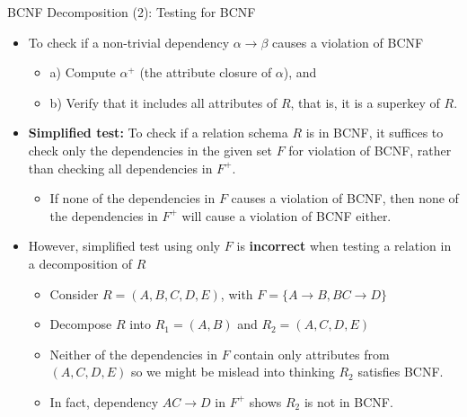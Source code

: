 \documentclass[aspectratio=169, xcolor=dvipsnames]{beamer}
\begin{document}
\begin{frame}{BCNF Decomposition (2): Testing for BCNF}
    \begin{itemize}[<+->]
        \item To check if a non-trivial dependency $\alpha \rightarrow \beta$ causes a violation of BCNF
        \begin{itemize}
            \item[$\triangleright$] a) Compute $\alpha^+$ (the attribute closure of $\alpha$), and
            \item[$\triangleright$] b) Verify that it includes all attributes of $R$, that is, it is a superkey of $R$.
        \end{itemize}
        \item \textbf{Simplified test:} To check if a relation schema $R$ is in BCNF, it suffices to check only the dependencies in the given set $F$ for violation of BCNF, rather than checking all dependencies in $F^+$.
        \begin{itemize}
            \item[$\triangleright$] If none of the dependencies in $F$ causes a violation of BCNF, then none of the dependencies in $F^+$ will cause a violation of BCNF either.
        \end{itemize}
        \item However, simplified test using only $F$ is \textbf{incorrect} when testing a relation in a decomposition of $R$
        \begin{itemize}
            \item[$\triangleright$] Consider $R = (A, B, C, D, E)$, with $F = \{A \rightarrow B, BC \rightarrow D\}$
            \item[$\triangleright$] Decompose $R$ into $R_1 = (A, B)$ and $R_2 = (A, C, D, E)$
            \item[$\triangleright$] Neither of the dependencies in $F$ contain only attributes from $(A, C, D, E)$ so we might be mislead into thinking $R_2$ satisfies BCNF.
            \item[$\triangleright$] In fact, dependency $AC \rightarrow D$ in $F^+$ shows $R_2$ is not in BCNF.
        \end{itemize}
    \end{itemize}
\end{frame}
\end{document}
